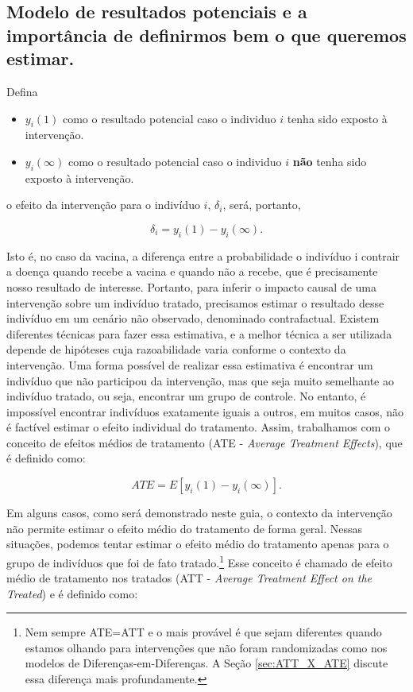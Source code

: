 \documentclass[portugues]{article}
\begin{document}
\subsection{Modelo de resultados potenciais e a importância de definirmos bem o que queremos estimar.}

Defina

\begin{itemize}
    \item $y_{i}(1)$ como o resultado potencial caso o individuo $i$ tenha sido exposto à intervenção.
    \item $y_{i}(\infty)$ como o resultado potencial caso o individuo $i$ \textbf{não} tenha sido exposto à intervenção.
\end{itemize}

\noindent o efeito da intervenção para o indivíduo $i$, $\delta_i$, será, portanto,

$$ \delta_i = y_{i}(1) - y_{i}(\infty). $$

Isto é, no caso da vacina, a diferença entre a probabilidade o indivíduo i contrair a doença quando recebe a vacina e quando não a recebe, que é precisamente nosso resultado de interesse. Portanto, para inferir o impacto causal de uma intervenção sobre um indivíduo tratado, precisamos estimar o resultado desse indivíduo em um cenário não observado, denominado contrafactual. Existem diferentes técnicas para fazer essa estimativa, e a melhor técnica a ser utilizada depende de hipóteses cuja razoabilidade varia conforme o contexto da intervenção. Uma forma possível de realizar essa estimativa é encontrar um indivíduo que não participou da intervenção, mas que seja muito semelhante ao indivíduo tratado, ou seja, encontrar um grupo de controle. No entanto, é impossível encontrar indivíduos exatamente iguais a outros, em muitos casos, não é factível estimar o efeito individual do tratamento. Assim, trabalhamos com o conceito de efeitos médios de tratamento (ATE - \textit{Average Treatment Effects}), que é definido como:

$$ ATE = E[y_i(1) - y_i(\infty)]. $$

Em alguns casos, como será demonstrado neste guia, o contexto da intervenção não permite estimar o efeito médio do tratamento de forma geral. Nessas situações, podemos tentar estimar o efeito médio do tratamento apenas para o grupo de indivíduos que foi de fato tratado.\footnote{Nem sempre ATE=ATT e o mais provável é que sejam diferentes quando estamos olhando para intervenções que não foram randomizadas como nos modelos de Diferenças-em-Diferenças. A Seção \ref{sec:ATT_X_ATE} discute essa diferença mais profundamente.} Esse conceito é chamado de efeito médio de tratamento nos tratados (ATT - \textit{Average Treatment Effect on the Treated}) e é definido como:
\end{document}
